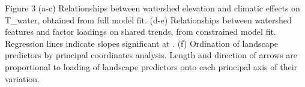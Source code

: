 \begin{center}
\end{center}
Figure 3 (a-c) Relationships between watershed elevation and climatic effects on T_water, obtained from full model fit. (d-e) Relationships between watershed features and factor loadings on shared trends, from constrained model fit. Regression lines indicate slopes significant at . (f) Ordination of landscape predictors by principal coordinates analysis. Length and direction of arrows are proportional to loading of landscape predictors onto each principal axis of their variation.

